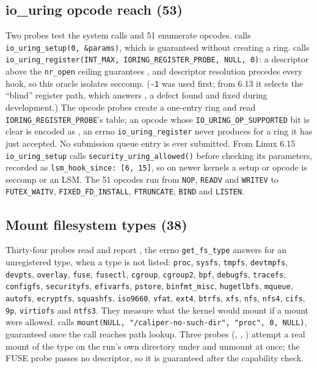 \subsection{io\_uring opcode reach (53)}
{\raggedright
Two probes test the system calls and 51 enumerate opcodes.  calls \texttt{io\_uring\_setup(0, \&params)}, which is guaranteed  without creating a ring.  calls \texttt{io\_uring\_register(INT\_MAX, IORING\_REGISTER\_PROBE, NULL, 0)}: a descriptor above the \texttt{nr\_open} ceiling guarantees , and descriptor resolution precedes every hook, so this oracle isolates seccomp. (\texttt{-1} was used first; from 6.13 it selects the ``blind'' register path, which answers , a defect found and fixed during development.) The opcode probes create a one-entry ring and read \texttt{IORING\_REGISTER\_PROBE}'s table; an opcode whose \texttt{IO\_URING\_OP\_SUPPORTED} bit is clear is encoded as , an errno \texttt{io\_uring\_register} never produces for a ring it has just accepted. No submission queue entry is ever submitted. From Linux 6.15 \texttt{io\_uring\_setup} calls \texttt{security\_uring\_allowed()} before checking its parameters, recorded as \texttt{lsm\_hook\_since: [6, 15]}, so on newer kernels a setup or opcode  is seccomp or an LSM. The 51 opcodes run from \texttt{NOP}, \texttt{READV} and \texttt{WRITEV} to \texttt{FUTEX\_WAITV}, \texttt{FIXED\_FD\_INSTALL}, \texttt{FTRUNCATE}, \texttt{BIND} and \texttt{LISTEN}.\par}

\subsection{Mount filesystem types (38)}
{\raggedright
Thirty-four probes read  and report , the errno \texttt{get\_fs\_type} answers for an unregistered type, when a type is not listed: \texttt{proc}, \texttt{sysfs}, \texttt{tmpfs}, \texttt{devtmpfs}, \texttt{devpts}, \texttt{overlay}, \texttt{fuse}, \texttt{fusectl}, \texttt{cgroup}, \texttt{cgroup2}, \texttt{bpf}, \texttt{debugfs}, \texttt{tracefs}, \texttt{configfs}, \texttt{securityfs}, \texttt{efivarfs}, \texttt{pstore}, \texttt{binfmt\_misc}, \texttt{hugetlbfs}, \texttt{mqueue}, \texttt{autofs}, \texttt{ecryptfs}, \texttt{squashfs}, \texttt{iso9660}, \texttt{vfat}, \texttt{ext4}, \texttt{btrfs}, \texttt{xfs}, \texttt{nfs}, \texttt{nfs4}, \texttt{cifs}, \texttt{9p}, \texttt{virtiofs} and \texttt{ntfs3}. They measure what the kernel would mount if a mount were allowed.  calls \texttt{mount(NULL, "/caliper-no-such-dir", "proc", 0, NULL)}, guaranteed  once the call reaches path lookup. Three probes (, , ) attempt a real mount of the type on the run's own directory under  and unmount at once; the FUSE probe passes no descriptor, so it is guaranteed  after the capability check.\par}


